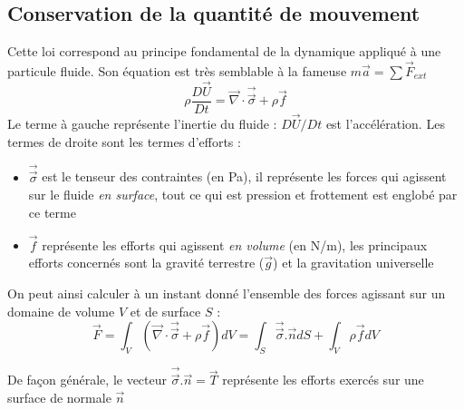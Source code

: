 \subsection{Conservation de la quantité de mouvement}
Cette loi correspond au principe fondamental de la dynamique appliqué à une particule fluide. Son équation est très semblable à la fameuse $m\vec{a}=\sum \vec{F}_{ext}$
%
\begin{equation}
    \rho \frac{D\vec{U}}{Dt} = \vec{\nabla} \cdot \vec{\vec{\sigma}} + \rho \vec{f}
    \label{eq:QDM}
\end{equation}
%
Le terme à gauche représente l'inertie du fluide : $D\vec{U}/Dt$ est l'accélération. Les termes de droite sont les termes d'efforts :

\begin{itemize}
    \item $\vec{\vec{\sigma}}$ est le tenseur des contraintes (en Pa), il représente les forces qui agissent sur le fluide \textit{en surface}, tout ce qui est pression et frottement est englobé par ce terme
    \item $\vec{f}$ représente les efforts qui agissent \textit{en volume} (en N/m), les principaux efforts concernés sont la gravité terrestre ($\vec{g}$) et la gravitation universelle
\end{itemize}

On peut ainsi calculer à un instant donné l'ensemble des forces agissant sur un domaine de volume $V$ et de surface $S$ :
%
\begin{equation}
    \vec{F} = \int_V { \left( \vec{\nabla} \cdot \vec{\vec{\sigma}} + \rho \vec{f} \right) dV }
            = \int_S { \vec{\vec{\sigma}}.\vec{n} dS} + \int_V {\rho \vec{f} dV }
\end{equation}

De façon générale, le vecteur $\vec{\vec{\sigma}}.\vec{n} = \vec{T}$ représente les efforts exercés sur une surface de normale $\vec{n}$


